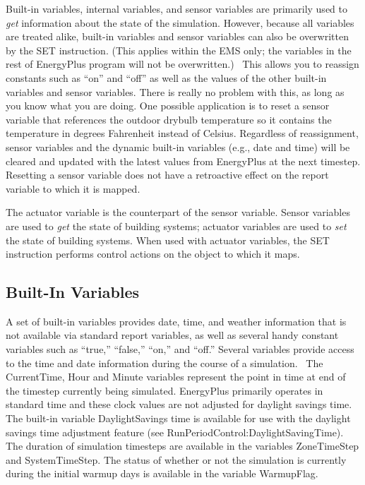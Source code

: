 Built-in variables, internal variables, and sensor variables are primarily used to \emph{get} information about the state of the simulation. However, because all variables are treated alike, built-in variables and sensor variables can also be overwritten by the SET instruction. (This applies within the EMS only; the variables in the rest of EnergyPlus program will not be overwritten.)~ This allows you to reassign constants such as ``on'' and ``off'' as well as the values of the other built-in variables and sensor variables. There is really no problem with this, as long as you know what you are doing. One possible application is to reset a sensor variable that references the outdoor drybulb temperature so it contains the temperature in degrees Fahrenheit instead of Celsius. Regardless of reassignment, sensor variables and the dynamic built-in variables (e.g., date and time) will be cleared and updated with the latest values from EnergyPlus at the next timestep. Resetting a sensor variable does not have a retroactive effect on the report variable to which it is mapped.

The actuator variable is the counterpart of the sensor variable. Sensor variables are used to \emph{get} the state of building systems; actuator variables are used to \emph{set} the state of building systems. When used with actuator variables, the SET instruction performs control actions on the object to which it maps.

\subsection{Built-In Variables}\label{built-in-variables}

A set of built-in variables provides date, time, and weather information that is not available via standard report variables, as well as several handy constant variables such as ``true,'' ``false,'' ``on,'' and ``off.'' Several variables provide access to the time and date information during the course of a simulation.~ The CurrentTime, Hour and Minute variables represent the point in time at end of the timestep currently being simulated. EnergyPlus primarily operates in standard time and these clock values are not adjusted for daylight savings time.~ The built-in variable DaylightSavings time is available for use with the daylight savings time adjustment feature (see RunPeriodControl:DaylightSavingTime). The duration of simulation timesteps are available in the variables ZoneTimeStep and SystemTimeStep. The status of whether or not the simulation is currently during the initial warmup days is available in the variable WarmupFlag.

